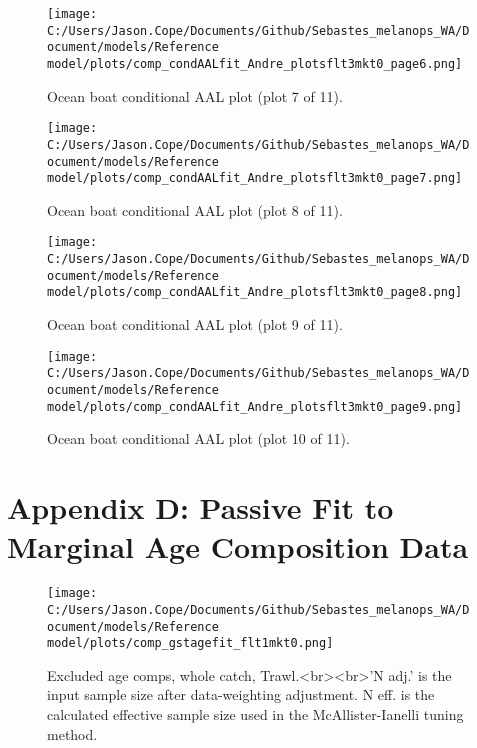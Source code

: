 \documentclass[11pt,
  letterpaper,
]{article}
\begin{document}
\begin{figure}
{\centering
\texttt{[image: C:/Users/Jason.Cope/Documents/Github/Sebastes\_melanops\_WA/Document/models/Reference model/plots/comp\_condAALfit\_Andre\_plotsflt3mkt0\_page6.png]}
}
\caption{Ocean boat conditional AAL plot (plot 7 of 11).\label{fig:comp_condAALfit_Andre_plotsflt3mkt0_page6}}
\end{figure}

\begin{figure}
{\centering
\texttt{[image: C:/Users/Jason.Cope/Documents/Github/Sebastes\_melanops\_WA/Document/models/Reference model/plots/comp\_condAALfit\_Andre\_plotsflt3mkt0\_page7.png]}
}
\caption{Ocean boat conditional AAL plot (plot 8 of 11).\label{fig:comp_condAALfit_Andre_plotsflt3mkt0_page7}}
\end{figure}

\begin{figure}
{\centering
\texttt{[image: C:/Users/Jason.Cope/Documents/Github/Sebastes\_melanops\_WA/Document/models/Reference model/plots/comp\_condAALfit\_Andre\_plotsflt3mkt0\_page8.png]}
}
\caption{Ocean boat conditional AAL plot (plot 9 of 11).\label{fig:comp_condAALfit_Andre_plotsflt3mkt0_page8}}
\end{figure}

\begin{figure}
{\centering
\texttt{[image: C:/Users/Jason.Cope/Documents/Github/Sebastes\_melanops\_WA/Document/models/Reference model/plots/comp\_condAALfit\_Andre\_plotsflt3mkt0\_page9.png]}
}
\caption{Ocean boat conditional AAL plot (plot 10 of 11).\label{fig:comp_condAALfit_Andre_plotsflt3mkt0_page9}}
\end{figure}

\clearpage

\hypertarget{app-d}{%
\section{Appendix D: Passive Fit to Marginal Age Composition Data}\label{app-d}}

\begin{figure}
{\centering
\texttt{[image: C:/Users/Jason.Cope/Documents/Github/Sebastes\_melanops\_WA/Document/models/Reference model/plots/comp\_gstagefit\_flt1mkt0.png]}
}
\caption{Excluded age comps, whole catch, Trawl.<br><br>'N adj.' is the input sample size after data-weighting adjustment. N eff. is the calculated effective sample size used in the McAllister-Ianelli tuning method.\label{fig:comp_gstagefit_flt1mkt0}}
\end{figure}
\end{document}
